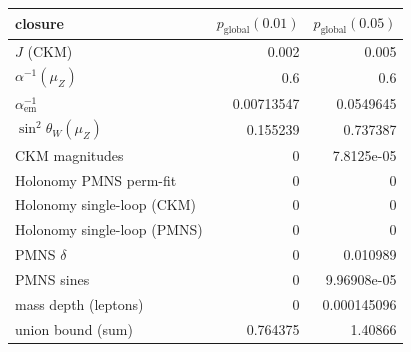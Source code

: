 \begin{tabular}{lrr}
\toprule
closure & $p_{\mathrm{global}}(0.01)$ & $p_{\mathrm{global}}(0.05)$ \\
\midrule
$J$ (CKM) & 0.002 & 0.005 \\
$\alpha^{-1}(\mu_Z)$ & 0.6 & 0.6 \\
$\alpha_{\mathrm{em}}^{-1}$ & 0.00713547 & 0.0549645 \\
$\sin^2\theta_W(\mu_Z)$ & 0.155239 & 0.737387 \\
CKM magnitudes & 0 & 7.8125e-05 \\
Holonomy PMNS perm-fit & 0 & 0 \\
Holonomy single-loop (CKM) & 0 & 0 \\
Holonomy single-loop (PMNS) & 0 & 0 \\
PMNS $\delta$ & 0 & 0.010989 \\
PMNS sines & 0 & 9.96908e-05 \\
mass depth (leptons) & 0 & 0.000145096 \\
\midrule
union bound (sum) & 0.764375 & 1.40866 \\
\bottomrule
\end{tabular}